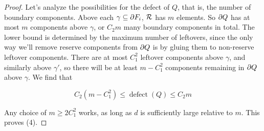 \begin{proof}
Let's analyze the possibilities for the defect of $Q$, that is, the number of
boundary components.  Above each $\gamma \subseteq \partial F_i$, $\mathcal{R}$ has $m$ elements.
So $\partial Q$ has at most $m$ components above $\gamma$, or $C_2m$ many boundary
components in total. The lower bound is determined by the maximum number of
leftovers, since the only way we'll remove reserve components from $\partial Q$ is
by gluing them to non-reserve leftover components. There are at most $C_1^2$
leftover components above $\gamma$, and similarly above $\gamma'$, so there
will be at least $m - C_1^2$ components remaining in $\partial Q$ above $\gamma$.
We find that

\[ C_2(m-C_1^2) \leq \operatorname{defect}(Q) \leq C_2m \]

Any choice of $m\geq 2C_1^2$ works, as long as $d$ is sufficiently large
relative to $m$.  This proves (4).

\end{proof}

